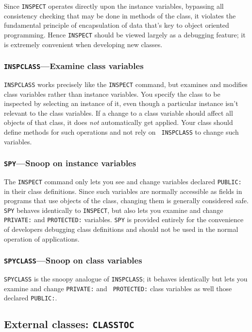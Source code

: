 \documentclass{article}
\begin{document}
Since {\tt INSPECT} operates directly upon the instance variables,
bypassing all consistency checking that may be done in methods of the
class, it violates the fundamental principle of encapsulation of data
that's key to object oriented programming.  Hence {\tt INSPECT}
should be viewed largely as a debugging feature; it is extremely
convenient when developing new classes.

\subsubsection{{\tt INSPCLASS}---Examine class variables}

{\tt INSPCLASS} works precisely like the {\tt INSPECT} command, but
examines and modifies class variables rather than instance variables.
You specify the class to be inspected by selecting an instance of it,
even though a particular instance isn't relevant to the
class variables.  If a change to a class variable should affect all
objects of that class, it does {\em not} automatically get applied.
Your class should define methods for such operations and not rely on {\tt
INSPCLASS} to change such variables.

\subsubsection{{\tt SPY}---Snoop on instance variables}

The {\tt INSPECT} command only lets you see and change variables
declared {\tt PUBLIC:} in their class definitions.  Since such
variables are normally accessible as fields in programs that use
objects of the class, changing them is generally considered safe.
{\tt SPY} behaves identically to {\tt INSPECT}, but also lets you
examine and change {\tt PRIVATE:} and {\tt PROTECTED:} variables.
{\tt SPY} is provided entirely for the convenience of developers
debugging class definitions and should not be used in the normal
operation of applications.

\subsubsection{{\tt SPYCLASS}---Snoop on class variables}

{\tt SPYCLASS} is the snoopy analogue of {\tt INSPCLASS}; it behaves
identically but lets you examine and change {\tt PRIVATE:} and {\tt
PROTECTED:} class variables as well those declared {\tt PUBLIC:}.

\subsection{External classes: {\tt CLASSTOC}}
\end{document}
